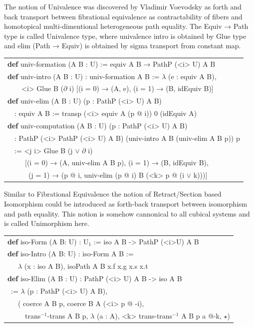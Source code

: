 \documentclass[a4paper,UKenglish,cleveref, autoref, thm-restate]{lipics-v2021}
\newcommand{\tabstyle}[0]{\scriptsize\ttfamily\fontseries{l}\selectfont}
\begin{document}
The notion of Univalence was discovered by Vladimir Voevodsky
as forth and back transport between fibrational equivalence
as contractability of fibers and homotopical multi-dimentional
heterogeneous path equality. The Equiv → Path type is called Univalence type,
where univalence intro is obtained by Glue type and elim (Path → Equiv) is
obtained by sigma transport from constant map.

\begin{table}[ht!]
\tabstyle
\begin{tabular}{l}
\textbf{def} univ-formation (A B : U) := equiv A B → PathP (<i> U) A B \\
\textbf{def} univ-intro (A B : U) : univ-formation A B := $\lambda$ (e : equiv A B), \\
\ \ \ \ <i> Glue B ($\partial$ i) [(i = 0) → (A, e), (i = 1) → (B, idEquiv B)] \\
\textbf{def} univ-elim (A B : U) (p : PathP (<i> U) A B) \\
\ \ : equiv A B := transp (<i> equiv A (p @ i)) 0 (idEquiv A) \\
\textbf{def} univ-computation (A B : U) (p : PathP (<i> U) A B) \\
\ \ : PathP (<i> PathP (<i> U) A B) (univ-intro A B (univ-elim A B p)) p \\
\ \ := <j i> Glue B (j $\vee$ $\partial$ i) \\
\ \ \ \ \ [(i = 0) → (A, univ-elim A B p), (i = 1) → (B, idEquiv B), \\
\ \ \ \ \ \ (j = 1) → (p @ i, univ-elim (p @ i) B (<k> p @ (i $\vee$ k)))] \\
\end{tabular}
\end{table}

Similar to Fibrational Equivalence the notion of Retract/Section based Isomorphism could be introduced
as forth-back transport between isomorphism and path equality. This notion is somehow cannonical to all
cubical systems and is called Unimorphism here.

\begin{table}[ht!]
\tabstyle
\begin{tabular}{l}
\textbf{def} iso-Form (A B: U) : U$_1$ := iso A B -> PathP (<i>U) A B \\
\textbf{def} iso-Intro (A B: U) : iso-Form A B := \\
\ \ \ $\lambda$ (x : iso A B), isoPath A B x.f x.g x.s x.t \\
\textbf{def} iso-Elim (A B : U) : PathP (<i> U) A B -> iso A B \\
\ := $\lambda$ (p : PathP (<i> U) A B), \\
\ \ \ ( coerce A B p, coerce B A (<i> p @ -i), \\
\ \ \ \ \ trans$^{-1}$-trans A B p, $\lambda$ (a : A), <k> trans-trans$^{-1}$ A B p a @-k, $\star$) \\
\end{tabular}
\end{table}
\end{document}
